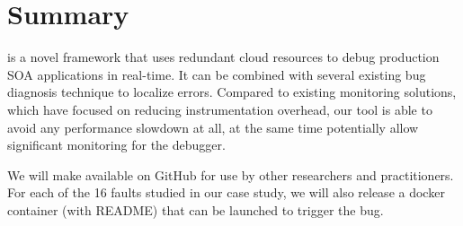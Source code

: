 

\section{Summary}
\label{sec:parikshanSummary}

\parikshan is a novel framework that uses redundant cloud resources to debug production SOA applications in real-time.
It can be combined with several existing bug diagnosis technique to localize errors.
Compared to existing monitoring solutions, which have focused on reducing instrumentation overhead, our tool is able to avoid any performance slowdown at all, at the same time potentially allow significant monitoring for the debugger.

We will make \parikshan available on GitHub for use by other researchers and practitioners.
For each of the 16 faults studied in our case study, we will also release a docker container (with README) that can be launched to trigger the bug.

